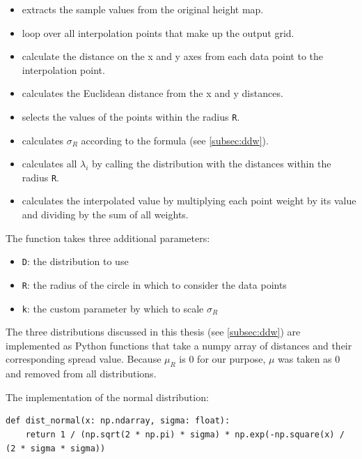 \begin{itemize}
    \item {} extracts the sample values from the original height map.
    \item {} loop over all interpolation points that make up the output grid.
    \item {} calculate the distance on the x and y axes from each data point to the interpolation point.
    \item {} calculates the Euclidean distance from the x and y distances.
    \item {} selects the values of the points within the radius \verb|R|.
    \item {} calculates $\sigma_R$ according to the formula (see \autoref{subsec:ddw}).
    \item {} calculates all $\lambda_i$ by calling the distribution with the distances within the radius \verb|R|.
    \item {} calculates the interpolated value by multiplying each point weight by its value and dividing by the sum of all weights.
\end{itemize}

The function takes three additional parameters:
\begin{itemize}
    \item \verb|D|: the distribution to use
    \item \verb|R|: the radius of the circle in which to consider the data points
    \item \verb|k|: the custom parameter by which to scale $\sigma_R$
\end{itemize}

The three distributions discussed in this thesis (see \autoref{subsec:ddw}) are implemented as Python functions that take a numpy array of distances and their corresponding spread value. Because $\mu_R$ is 0 for our purpose, $\mu$ was taken as 0 and removed from all distributions.

\begin{minipage}{\textwidth}
The implementation of the normal distribution:
\begin{lstlisting}[language={[AS]Python},caption=The normal distribution for DDW]
def dist_normal(x: np.ndarray, sigma: float):
    return 1 / (np.sqrt(2 * np.pi) * sigma) * np.exp(-np.square(x) / (2 * sigma * sigma))
\end{lstlisting}
\end{minipage}

